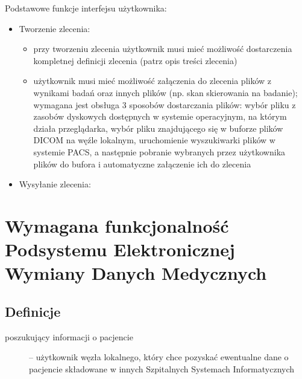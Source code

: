 \documentclass[a4paper]{article}
\begin{document}
Podstawowe funkcje interfejsu użytkownika:
\begin{itemize}
  \item Tworzenie zlecenia:
      \begin{itemize}
      \item przy tworzeniu zlecenia użytkownik musi mieć możliwość dostarczenia kompletnej definicji zlecenia (patrz opis treści zlecenia)
      \item użytkownik musi mieć możliwość załączenia do zlecenia plików z wynikami badań oraz innych plików (np. skan 
	    skierowania na badanie); wymagana jest obsługa 3 sposobów dostarczania plików: wybór pliku z zasobów 
	    dyskowych dostępnych w systemie operacyjnym, na którym działa przeglądarka, wybór pliku znajdującego się 
	    w buforze plików DICOM na węźle lokalnym, uruchomienie wyszukiwarki plików w systemie PACS, a następnie 
	    pobranie wybranych przez użytkownika plików do bufora i automatyczne załączenie ich do zlecenia
      \end{itemize}
  \item Wysyłanie zlecenia:
\end{itemize}

\section{Wymagana funkcjonalność Podsystemu Elektronicznej Wymiany Danych Medycznych}

\subsection{Definicje}
\begin{description}
\item[poszukujący informacji o pacjencie] – użytkownik węzła lokalnego, który chce pozyskać ewentualne dane o pacjencie
	składowane w innych Szpitalnych Systemach Informatycznych 
\end{description}
\end{document}
